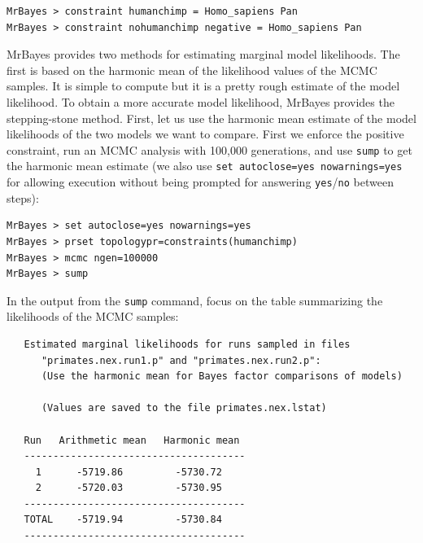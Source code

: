 \documentclass[12pt]{book}
\newcommand{\ttt}[1]{\texttt{#1}}
\begin{document}
\begin{singlespacing}
\small
\begin{verbatim}
MrBayes > constraint humanchimp = Homo_sapiens Pan
MrBayes > constraint nohumanchimp negative = Homo_sapiens Pan
\end{verbatim}
\end{singlespacing}
\normalsize

MrBayes provides two methods for estimating marginal model likelihoods. The first is based on the
harmonic mean of the likelihood values of the MCMC samples. It is simple to compute but it is a
pretty rough estimate of the model likelihood. To obtain a more accurate model likelihood, MrBayes
provides the stepping-stone method. First, let us use the harmonic mean estimate of the model
likelihoods of the two models we want to compare. First we enforce the positive constraint, run an
MCMC analysis with 100,000 generations, and use \ttt{sump} to get the harmonic mean estimate (we
also use \ttt{set autoclose=yes nowarnings=yes} for allowing execution without being prompted for
answering \ttt{yes}/\ttt{no} between steps):

\begin{singlespacing}
\small
\begin{verbatim}
MrBayes > set autoclose=yes nowarnings=yes
MrBayes > prset topologypr=constraints(humanchimp)
MrBayes > mcmc ngen=100000
MrBayes > sump
\end{verbatim}
\end{singlespacing}
\normalsize

In the output from the \ttt{sump} command, focus on the table summarizing the likelihoods of the
MCMC samples:

\begin{singlespacing}
\footnotesize
\begin{verbatim}
   Estimated marginal likelihoods for runs sampled in files
      "primates.nex.run1.p" and "primates.nex.run2.p":
      (Use the harmonic mean for Bayes factor comparisons of models)

      (Values are saved to the file primates.nex.lstat)

   Run   Arithmetic mean   Harmonic mean
   --------------------------------------
     1      -5719.86         -5730.72
     2      -5720.03         -5730.95
   --------------------------------------
   TOTAL    -5719.94         -5730.84
   --------------------------------------

\end{verbatim}
\end{singlespacing}
\normalsize
\end{document}
